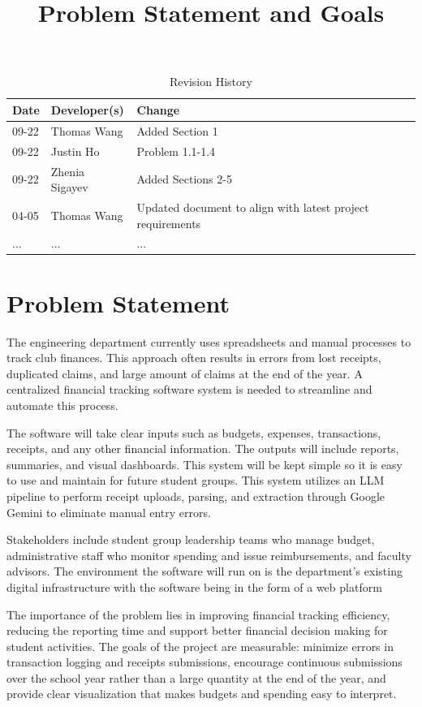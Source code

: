 \documentclass{article}
\title{Problem Statement and Goals\\\progname}
\author{\authname}
\date{}
\begin{document}
\maketitle

\begin{table}[hp]
\caption{Revision History} \label{TblRevisionHistory}
\begin{tabularx}{\textwidth}{llX}
\toprule
\textbf{Date} & \textbf{Developer(s)} & \textbf{Change}\\
\midrule
09-22 & Thomas Wang & Added Section 1\\
09-22 & Justin Ho& Problem 1.1-1.4\\
09-22 & Zhenia Sigayev & Added Sections 2-5\\
04-05 & Thomas Wang & Updated document to align with latest project requirements\\
... & ... & ...\\
\bottomrule
\end{tabularx}
\end{table}

\section{Problem Statement}

The engineering department currently uses spreadsheets and manual processes to track club finances. This approach
often results in errors from lost receipts, duplicated claims, and large amount of claims at the end of the year. A centralized
financial tracking software system is needed to streamline and automate this process.

The software will take clear inputs such as budgets, expenses, transactions, receipts, and any other financial
information. The outputs will include reports, summaries, and visual dashboards. This system will be kept simple
so it is easy to use and maintain for future student groups. This system utilizes an LLM pipeline to perform receipt uploads,
parsing, and extraction through Google Gemini to eliminate manual entry errors. 

Stakeholders include student group leadership teams who manage budget, administrative staff who monitor spending and 
issue reimbursements, and faculty advisors. The environment the software will run on is the department's existing digital 
infrastructure with the software being in the form of a web platform

The importance of the problem lies in improving financial tracking efficiency, reducing the reporting time
and support better financial decision making for student activities. The goals of the project are measurable: minimize
errors in transaction logging and receipts submissions, encourage continuous submissions over the school year rather than 
a large quantity at the end of the year, and provide clear visualization that makes budgets and spending easy to interpret.
\end{document}
